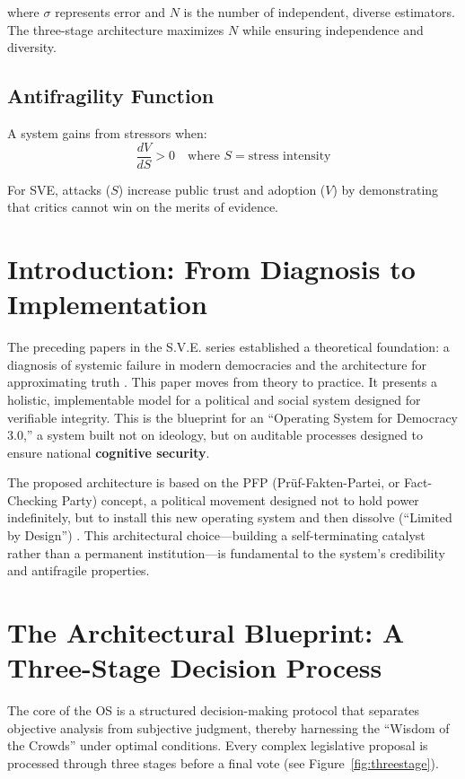 \documentclass[11pt,a4paper]{article}
\begin{document}
where $\sigma$ represents error and $N$ is the number of independent, diverse estimators. The three-stage architecture maximizes $N$ while ensuring independence and diversity.

\subsection*{Antifragility Function}
A system gains from stressors when:
\begin{equation}
\frac{dV}{dS} > 0 \quad \text{where } S = \text{stress intensity}
\label{eq:antifragile}
\end{equation}

\noindent For SVE, attacks ($S$) increase public trust and adoption ($V$) by demonstrating that critics cannot win on the merits of evidence.

\vspace{0.5cm}
\clearpage
\setcounter{page}{1}

\section{Introduction: From Diagnosis to Implementation}
The preceding papers in the S.V.E. series established a theoretical foundation: a diagnosis of systemic failure in modern democracies \citep{Kovnatsky2025SVE1} and the architecture for approximating truth \citep{Kovnatsky2025SVE2}. This paper moves from theory to practice. It presents a holistic, implementable model for a political and social system designed for verifiable integrity. This is the blueprint for an ``Operating System for Democracy 3.0,'' a system built not on ideology, but on auditable processes designed to ensure national \textbf{cognitive security}.

The proposed architecture is based on the PFP (Prüf-Fakten-Partei, or Fact-Checking Party) concept, a political movement designed not to hold power indefinitely, but to install this new operating system and then dissolve (``Limited by Design'') \citep{Kovnatsky2025PFP}. This architectural choice—building a self-terminating catalyst rather than a permanent institution—is fundamental to the system's credibility and antifragile properties.

\section{The Architectural Blueprint: A Three-Stage Decision Process}
The core of the OS is a structured decision-making protocol that separates objective analysis from subjective judgment, thereby harnessing the ``Wisdom of the Crowds'' \citep{Surowiecki2004} under optimal conditions. Every complex legislative proposal is processed through three stages before a final vote (see Figure~\ref{fig:threestage}).
\end{document}
